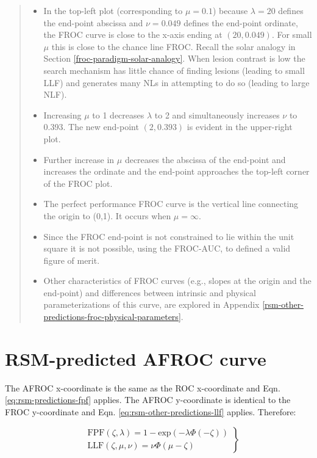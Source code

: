 \documentclass[
]{book}
\providecommand{\tightlist}{%
  \setlength{\itemsep}{0pt}\setlength{\parskip}{0pt}}
\begin{document}
\begin{quote}
\begin{itemize}
\tightlist
\item
  In the top-left plot (corresponding to \(\mu = 0.1\)) because \(\lambda = 20\) defines the end-point abscissa and \(\nu = 0.049\) defines the end-point ordinate, the FROC curve is close to the x-axis ending at \((20, 0.049)\). For small \(\mu\) this is close to the chance line FROC. Recall the solar analogy in Section \ref{froc-paradigm-solar-analogy}. When lesion contrast is low the search mechanism has little chance of finding lesions (leading to small LLF) and generates many NLs in attempting to do so (leading to large NLF).
\item
  Increasing \(\mu\) to 1 decreases \(\lambda\) to 2 and simultaneously increases \(\nu\) to 0.393. The new end-point \((2,0.393)\) is evident in the upper-right plot.
\item
  Further increase in \(\mu\) decreases the abscissa of the end-point and increases the ordinate and the end-point approaches the top-left corner of the FROC plot.
\item
  The perfect performance FROC curve is the vertical line connecting the origin to (0,1). It occurs when \(\mu = \infty\).
\item
  Since the FROC end-point is not constrained to lie within the unit square it is not possible, using the FROC-AUC, to defined a valid figure of merit.
\item
  Other characteristics of FROC curves (e.g., slopes at the origin and the end-point) and differences between intrinsic and physical parameterizations of this curve, are explored in Appendix \ref{rsm-other-predictions-froc-physical-parameters}.
\end{itemize}
\end{quote}

\hypertarget{rsm-other-predictions-froc-afroc-curve}{%
\section{RSM-predicted AFROC curve}\label{rsm-other-predictions-froc-afroc-curve}}

The AFROC x-coordinate is the same as the ROC x-coordinate and Eqn. \eqref{eq:rsm-predictions-fpf} applies. The AFROC y-coordinate is identical to the FROC y-coordinate and Eqn. \eqref{eq:rsm-other-predictions-llf} applies. Therefore:

\begin{equation}
\left. 
\begin{aligned}
&\text{FPF}\left (\zeta , \lambda\right ) = 1 - \text{exp}\left ( -\lambda \Phi\left ( -\zeta \right )  \right )\\
&\text{LLF}\left( \zeta, \mu, \nu \right) = \nu  \Phi \left ( \mu - \zeta \right )
\end{aligned}
\right \}
\label{eq:rsm-other-predictions-afroc}
\end{equation}
\end{document}
